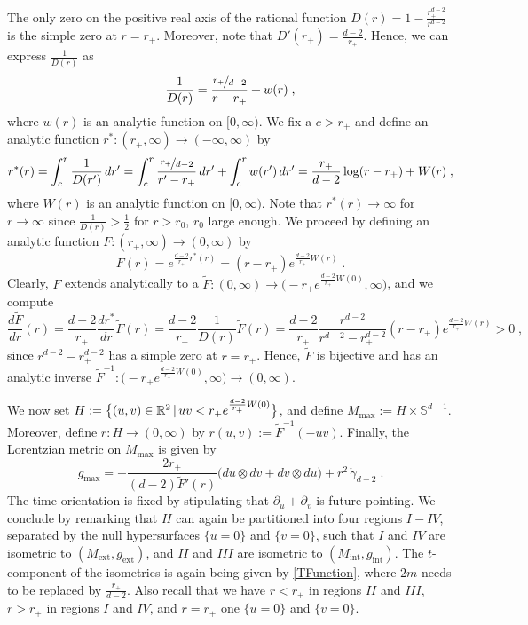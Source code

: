 \documentclass[reqno]{article}
\newcommand{\R}{\mathbb{R}}
\newcommand{\Sd}{\mathbb{S}^{d-1}}
\newcommand{\Mint}{M_{\mathrm{int}}}
\newcommand{\gint}{g_{\mathrm{int}}}
\newcommand{\Mext}{M_{\mathrm{ext}}}
\newcommand{\gext}{g_{\mathrm{ext}}}
\newcommand{\Mmax}{M_{\mathrm{max}}}
\newcommand{\gmax}{g_{\mathrm{max}}}
\begin{document}
The only zero on the positive real axis of the rational function $D(r) = 1 - \frac{r_+^{d-2}}{r^{d-2}}$ is the simple zero at $r = r_+$. Moreover, note that $D'(r_+) = \frac{d-2}{r_+}$. Hence, we can express $\frac{1}{D(r)}$ as
\begin{equation*}
\frac{1}{D(r)} = \frac{\nicefrac{r_+}{d-2}}{r-r_+} + w(r) \;,
\end{equation*}
where $w(r)$ is an analytic function on $[0,\infty)$. We fix a $c > r_+$ and define an analytic function $r^* : (r_+, \infty) \to (-\infty, \infty)$ by
\begin{equation}
\label{RStar2}
r^*(r) = \int_c^r \frac{1}{D(r')} \, dr' = \int_c^r \frac{\nicefrac{r_+}{d-2}}{r' - r_+} \, dr' + \int_c^r w(r') \, dr' = \frac{r_+}{d-2}\log (r-r_+) + W(r) \;,
\end{equation}
where $W(r)$ is an analytic function on $[0, \infty)$. Note that $r^*(r) \to \infty$ for $r \to \infty$ since $\frac{1}{D(r)} > \frac{1}{2}$ for $r > r_0$, $r_0$ large enough. We proceed by defining an analytic function $F : (r_+ , \infty) \to (0,\infty)$ by
\begin{equation*}
F(r) = e^{\frac{d-2}{r_+} r^*(r)} = (r- r_+) e^{\frac{d-2}{r_+} W(r)} \;.
\end{equation*}
Clearly, $F$ extends analytically to a $\tilde{F} : (0, \infty) \to \big(-r_+ e^{\frac{d-2}{r_+} W(0)}, \infty\big)$, and we compute
\begin{equation*}
\frac{d\tilde{F}}{dr}(r) = \frac{d-2}{r_+} \frac{dr^*}{dr} \tilde{F}(r) = \frac{d-2}{r_+} \frac{1}{D(r)} \tilde{F}(r) = \frac{d-2}{r_+} \frac{r^{d-2}}{r^{d-2} - r_+^{d-2}}(r-r_+) e^{\frac{d-2}{r_+}W(r)} >0 \;,
\end{equation*}
since $r^{d-2} - r_+^{d-2}$ has a simple zero at $r = r_+$.
Hence, $\tilde{F}$ is bijective and has an analytic inverse $\tilde{F}^{-1} : \big(-r_+ e^{\frac{d-2}{r_+} W(0)}, \infty\big) \to (0, \infty)$. 

We now set $H:= \big{\{}(u,v) \in \R^2 \, | \, uv < r_+ e^{\frac{d-2}{r_+} W(0)} \big{\}}$, and define $\Mmax := H \times \Sd$. Moreover, define $r : H \to (0, \infty)$ by $r(u,v) := \tilde{F}^{-1}(-uv)$. Finally, the Lorentzian metric on $\Mmax$ is given by
\begin{equation*}
\gmax = - \frac{2r_+}{(d-2) \tilde{F}'(r)} \big( du \otimes dv + dv \otimes du\big) + r^2 \, \mathring{\gamma}_{d-2} \;.
\end{equation*}
The time orientation is fixed by stipulating that $\partial_u + \partial_v$ is future pointing. We conclude by remarking that $H$ can again be partitioned into four regions $I - IV$, separated by the null hypersurfaces $\{u = 0\}$ and $\{v=0\}$, such that $I$ and $IV$ are isometric to $(\Mext, \gext)$, and $II$ and $III$ are isometric to $(\Mint, \gint)$. The $t$-component of the isometries  is again being given by \eqref{TFunction}, where $2m$ needs to be replaced by $\frac{r_+}{d-2}$. Also recall that we have $r<r_+$ in regions $II$ and $III$, $r > r_+$ in regions $I$ and $IV$, and $r=r_+$ one $\{u=0\}$ and $\{v = 0\}$.
\end{document}
